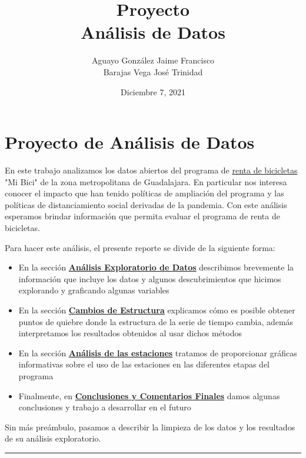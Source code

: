 \documentclass[
]{article}
\title{Proyecto \\ Análisis de Datos}
\author{Aguayo González Jaime Francisco\\ Barajas Vega José Trinidad}
\date{ Diciembre 7, 2021}
\begin{document}
\maketitle
\newpage
\hypertarget{proyecto-de-anuxe1lisis-de-datos}{%
\section{Proyecto de Análisis de
Datos}\label{proyecto-de-anuxe1lisis-de-datos}}

En este trabajo analizamos los datos abiertos del programa de
\href{https://mibici.net}{renta de bicicletas} "Mi Bici" de la zona
metropolitana de Guadalajara. En particular nos interesa conocer el
impacto que han tenido políticas de ampliación del programa y las
políticas de distanciamiento social derivadas de la pandemia. Con este
análisis esperamos brindar información que permita evaluar el programa
de renta de bicicletas.

Para hacer este análisis, el presente reporte se divide de la siguiente
forma:

\begin{itemize}
\item
  En la sección
  \protect\hyperlink{anuxe1lisis-exploratorio-de-datos}{\textbf{Análisis
  Exploratorio de Datos}} describimos brevemente la información que
  incluye los datos y algunos descubrimientos que hicimos explorando y
  graficando algunas variables
\item
  En la sección \protect\hyperlink{cambios-de-estructura}{\textbf{Cambios de
  Estructura}} explicamos cómo es posible obtener puntos de quiebre donde
  la estructura de la serie de tiempo cambia, además interpretamos los
  resultados obtenidos al usar dichos métodos
\item
  En la sección
  \protect\hyperlink{anuxe1lisis-de-las-estaciones}{\textbf{Análisis de las
  estaciones}} tratamos de proporcionar gráficas informativas sobre el
  uso de las estaciones en las diferentes etapas del programa
\item
  Finalmente, en
  \protect\hyperlink{conclusiones-y-comentarios-finales}{\textbf{Conclusiones y
  Comentarios Finales}} damos algunas conclusiones y trabajo a
  desarrollar en el futuro
\end{itemize}

Sin más preámbulo, pasamos a describir la limpieza de los datos y los
resultados de su análisis exploratorio.
\newpage
\begin{center}\rule{0.5\linewidth}{0.5pt}\end{center}
\end{document}
